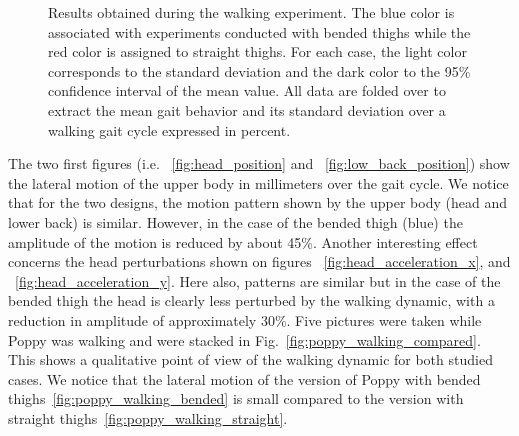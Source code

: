 \begin{figure}[!h]
    \hfil
    \hfil
    \hfil
    \hfil
    \hfil
    \caption{Results obtained during the walking experiment.
    The blue color is associated with experiments conducted with bended thighs while the red color is assigned to straight thighs.
    For each case, the light color corresponds to the standard deviation and the dark color to the 95\% confidence interval of the mean value.
    All data are folded over to extract the mean gait behavior and its standard deviation over a walking gait cycle expressed in percent.}
    \label{fig:walk_result}
\end{figure}

The two first figures (i.e. ~\ref{fig:head_position} and ~\ref{fig:low_back_position}) show the lateral motion of the upper body in millimeters over the gait cycle. We notice that for the two designs, the motion pattern shown by the upper body (head and lower back) is similar. However, in the case of the bended thigh (blue) the amplitude of the motion is reduced by about 45\%. Another interesting effect concerns the head perturbations shown on figures ~\ref{fig:head_acceleration_x}, and ~\ref{fig:head_acceleration_y}. Here also, patterns are similar but in the case of the bended thigh the head is clearly less perturbed by the walking dynamic, with a reduction in amplitude of approximately 30\%. Five pictures were taken while Poppy was walking and were stacked in Fig.~\ref{fig:poppy_walking_compared}. This shows a qualitative point of view of the walking dynamic for both studied cases.
We notice that the lateral motion of the version of Poppy with bended thighs~\ref{fig:poppy_walking_bended} is small compared to the version with straight thighs~\ref{fig:poppy_walking_straight}.


